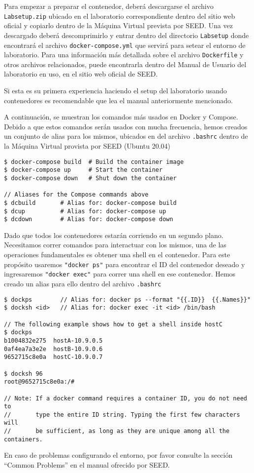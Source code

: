 Para empezar a preparar el contenedor, deberá descargarse el archivo \texttt{Labsetup.zip} ubicado en el laboratorio correspondiente dentro del sitio web oficial y copiarlo dentro de la Máquina Virtual prevista por SEED. Una vez descargado deberá descomprimirlo y entrar dentro del directorio \texttt{Labsetup} donde encontrará el archivo \texttt{docker-compose.yml} que servirá para setear el entorno de laboratorio. Para una información más detallada sobre el archivo \texttt{Dockerfile} y otros archivos relacionados, puede encontrarla dentro del Manual de Usuario del laboratorio en uso, en el sitio web oficial de SEED.

Si esta es su primera experiencia haciendo el setup del laboratorio usando contenedores es recomendable que lea el manual anteriormente mencionado.

A continuación, se muestran los comandos más usados en Docker y Compose.
Debido a que estos comandos serán usados con mucha frecuencia, hemos creados un conjunto de alias para los mismos, ubicados en del archivo \texttt{.bashrc} dentro de la Máquina Virtual provista por SEED (Ubuntu 20.04)

\begin{lstlisting}
$ docker-compose build  # Build the container image
$ docker-compose up     # Start the container
$ docker-compose down   # Shut down the container

// Aliases for the Compose commands above
$ dcbuild       # Alias for: docker-compose build
$ dcup          # Alias for: docker-compose up
$ dcdown        # Alias for: docker-compose down
\end{lstlisting}


Dado que todos los contenedores estarán corriendo en un segundo plano. Necesitamos correr comandos para interactuar con los mismos, una de las operaciones fundamentales es obtener una shell en el contenedor. 
Para este propósito usaremos \texttt{"docker ps"} para encontrar el ID del contenedor deseado y ingresaremos \texttt{"docker exec"} para correr una shell en ese contenedor.
Hemos creado un alias para ello dentro del archivo \texttt{.bashrc}

\begin{lstlisting}
$ dockps        // Alias for: docker ps --format "{{.ID}}  {{.Names}}" 
$ docksh <id>   // Alias for: docker exec -it <id> /bin/bash

// The following example shows how to get a shell inside hostC
$ dockps
b1004832e275  hostA-10.9.0.5
0af4ea7a3e2e  hostB-10.9.0.6
9652715c8e0a  hostC-10.9.0.7

$ docksh 96
root@9652715c8e0a:/#  

// Note: If a docker command requires a container ID, you do not need to 
//       type the entire ID string. Typing the first few characters will 
//       be sufficient, as long as they are unique among all the containers. 
\end{lstlisting}

En caso de problemas configurando el entorno, por favor consulte la sección ``Common Problems'' en el manual ofrecido por SEED. 

